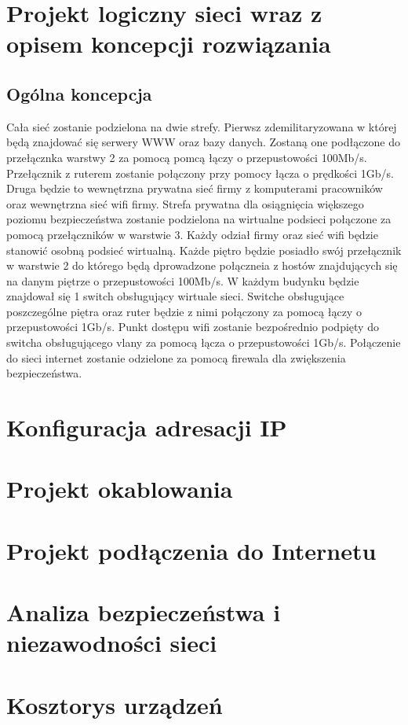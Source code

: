 \documentclass{report}
\begin{document}
\section{Projekt logiczny sieci wraz z opisem koncepcji rozwiązania}
\subsection{Ogólna koncepcja}

Cała sieć zostanie podzielona na dwie strefy. Pierwsz zdemilitaryzowana w której będą znajdować się serwery WWW oraz bazy danych. 
Zostaną one podłączone do przełącznka warstwy 2 za pomocą pomcą łączy o przepustowości 100Mb/s. Przełącznik z ruterem zostanie połączony 
przy pomocy łącza o prędkości 1Gb/s. Druga będzie to wewnętrzna prywatna sieć firmy z komputerami pracowników oraz wewnętrzna sieć wifi firmy. 
Strefa prywatna dla osiągnięcia większego poziomu bezpieczeństwa zostanie podzielona na wirtualne podsieci połączone za pomocą przełączników w warstwie 3. Każdy odział firmy
oraz sieć wifi będzie stanowić osobną podsieć wirtualną. Każde piętro będzie posiadło swój przełącznik w warstwie 2 do którego będą
dprowadzone połączneia z hostów znajdujących się na danym piętrze
 o przepustowości 100Mb/s. W każdym budynku będzie znajdował się 1 switch obsługujący wirtuale sieci.
Switche obsługujące poszczególne piętra oraz ruter będzie z nimi połączony za pomocą łączy o przepustowości 1Gb/s. Punkt dostępu wifi
zostanie bezpośrednio podpięty do switcha  obsługującego vlany za pomocą łącza o przepustowości 1Gb/s.
Połączenie do sieci internet zostanie odzielone za pomocą firewala dla zwiększenia
bezpieczeństwa.


\section{Konfiguracja adresacji IP}
\section{Projekt okablowania}
\section{Projekt podłączenia do Internetu}
\section{Analiza bezpieczeństwa i niezawodności sieci}
\section{Kosztorys urządzeń}
\end{document}
